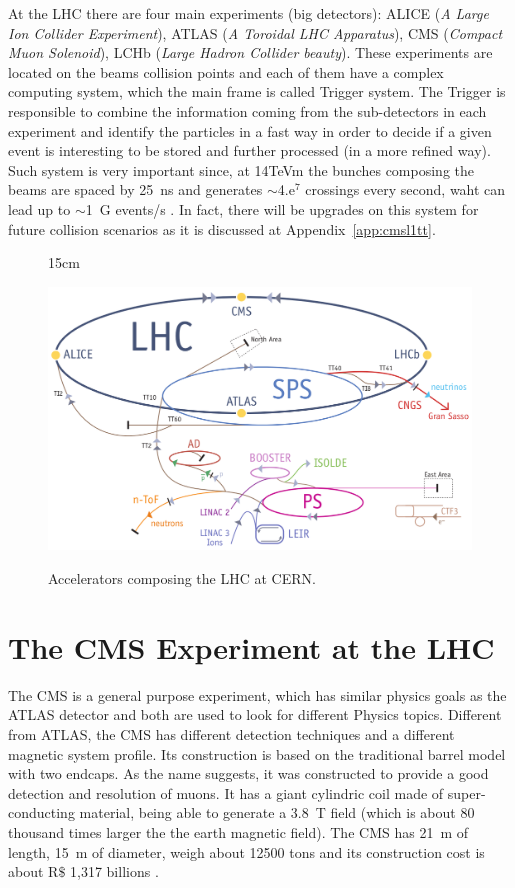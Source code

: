 At the LHC there are four main experiments (big detectors): ALICE (\textit{A Large Ion Collider Experiment}), ATLAS (\textit{A Toroidal LHC Apparatus}), CMS (\textit{Compact Muon Solenoid}), LCHb (\textit{Large Hadron Collider beauty}). These experiments are located on the beams collision points and each of them have a complex computing system, which the main frame is called Trigger system. The Trigger is responsible to combine the information coming from the sub-detectors in each experiment and identify the particles in a fast way in order to decide if a given event is interesting to be stored and further processed (in a more refined way). Such system is very important since, at 14TeVm the bunches composing the beams are spaced by 25~ns and generates $\sim$4.e$^{7}$ crossings every second, waht can lead up to $\sim$1~G events/s \cite{bib:JINST-3-362-2008, bib:lhc-guide}. In fact, there will be upgrades on this system for future collision scenarios as it is discussed at Appendix~\ref{app:cmsl1tt}.

\begin{figure}[htbp]{15cm}
\caption{Accelerators composing the LHC at CERN.}
\includegraphics[scale=0.35]{ChapterCMS/figs/lhc_parts.png}
\label{fig:LHC_parts}
\end{figure}

\section{The CMS Experiment at the LHC}
The CMS is a general purpose experiment, which has similar physics goals as the ATLAS detector and both are used to look for different Physics topics. Different from ATLAS, the CMS has different detection techniques and a different magnetic system profile. Its construction is based on the traditional barrel model with two endcaps. As the name suggests, it was constructed to provide a good detection and resolution of muons. It has a giant cylindric coil made of super-conducting material, being able to generate a 3.8~T field (which is about 80 thousand times larger the the earth magnetic field). The CMS has 21~m of length, 15~m of diameter, weigh about 12500 tons and its construction cost is about R$\$$ 1,317 billions \cite{bib:lhc-guide,bib:cms-page}.

